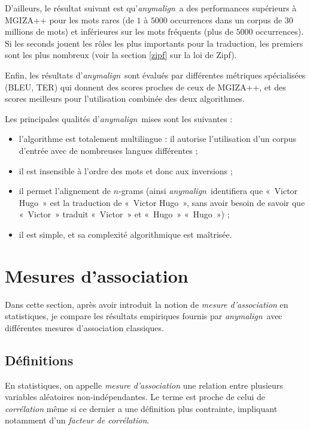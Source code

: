 \documentclass[a4paper,10pt]{article}
\newcommand{\anym}{\emph{anymalign}}
\newcommand{\guill}[1]{«~#1~»}
\begin{document}
D'ailleurs, le résultat suivant est qu'\anym~a des performances supérieurs à MGIZA++ pour les mots rares (de $1$ à $5000$ occurrences dans un corpus de $30$ millions de mots) et inférieures sur les mots fréquents (plus de $5000$ occurrences). Si les seconds jouent les rôles les plus importants pour la traduction, les premiers sont les plus nombreux (voir la section \ref{zipf} sur la loi de Zipf).

Enfin, les résultats d'\anym~sont évalués par différentes métriques spécialisées (BLEU, TER) qui donnent des scores proches de ceux de MGIZA++, et des scores meilleurs pour l'utilisation combinée des deux algorithmes.

Les principales qualités d'\anym~mises sont les suivantes :
\begin{itemize}
\item l'algorithme est totalement  multilingue : il autorise l'utilisation d'un corpus d'entrée avec de nombreuses langues différentes ;
\item il est insensible à l'ordre des mots et donc aux inversions ;
\item il permet l'alignement de $n$-grams (ainsi \anym~identifiera que \guill{Victor Hugo} est la traduction de \guill{Victor Hugo}, sans avoir besoin de savoir que \guill{Victor} traduit \guill{Victor} et \guill{Hugo} \guill{Hugo}) ;
\item il est simple, et sa complexité algorithmique est maîtrisée.
\end{itemize}



\section{Mesures d'association}

Dans cette section, après avoir introduit la notion de \emph{mesure d'association} en statistiques, je compare les résultats empiriques fournis par \anym~avec différentes mesures d'association classiques.

\subsection{Définitions}

En statistiques, on appelle \emph{mesure d'association} une relation entre plusieurs variables aléatoires non-indépendantes. Le terme est proche de celui de \emph{corrélation} même si ce dernier a une définition plus contrainte, impliquant notamment d'un \emph{facteur de corrélation}.
\end{document}
